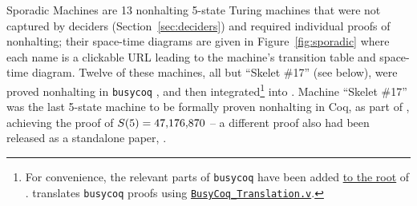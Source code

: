 Sporadic Machines are 13 nonhalting 5-state Turing machines that were not captured by deciders (Section~\ref{sec:deciders}) and required individual \Coq proofs of nonhalting; their space-time diagrams are given in Figure~\ref{fig:sporadic} where each name is a clickable URL leading to the machine's transition table and space-time diagram. Twelve of these machines, \ie all but ``Skelet \#17'' (see below), were proved nonhalting in \texttt{busycoq} \cite{busycoq}, and then integrated\footnote{For convenience, the relevant parts of \texttt{busycoq} have been added \href{https://github.com/ccz181078/Coq-BB5/tree/main/BusyCoq}{to the root} of \CoqBB. \CoqBB translates \texttt{busycoq} proofs using \href{https://github.com/ccz181078/Coq-BB5/blob/main/CoqBB5/BB5/BusyCoq_Translation.v}{\texttt{BusyCoq\_Translation.v}}.} into \CoqBB. Machine ``Skelet \#17'' was the last 5-state machine to be formally proven nonhalting in Coq, as part of \CoqBB, achieving the proof of $S(5) = 47{,}176{,}870$ -- a different proof also had been released as a standalone paper, \cite{xu2024skelet17fifthbusy}.

